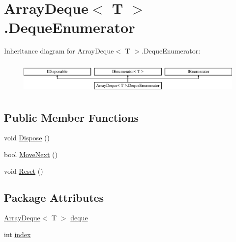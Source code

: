 \hypertarget{structOTA_1_1Misc_1_1ArrayDeque_1_1DequeEnumerator}{}\section{Array\+Deque$<$ T $>$.Deque\+Enumerator}
\label{structOTA_1_1Misc_1_1ArrayDeque_1_1DequeEnumerator}
Inheritance diagram for Array\+Deque$<$ T $>$.Deque\+Enumerator\+:\begin{figure}[H]
\begin{center}
\leavevmode
\includegraphics[height=1.659259cm]{structOTA_1_1Misc_1_1ArrayDeque_1_1DequeEnumerator}
\end{center}
\end{figure}
\subsection*{Public Member Functions}
\begin{DoxyCompactItemize}
\item 
void \hyperlink{structOTA_1_1Misc_1_1ArrayDeque_1_1DequeEnumerator_a6e2d745cdb7a7b983f861ed6a9a541a7}{Dispose} ()
\item 
bool \hyperlink{structOTA_1_1Misc_1_1ArrayDeque_1_1DequeEnumerator_ad5316c283894d57be1450edab878aed0}{Move\+Next} ()
\item 
void \hyperlink{structOTA_1_1Misc_1_1ArrayDeque_1_1DequeEnumerator_a372de693ad40b3f42839c8ec6ac845f4}{Reset} ()
\end{DoxyCompactItemize}
\subsection*{Package Attributes}
\begin{DoxyCompactItemize}
\item 
\hyperlink{classOTA_1_1Misc_1_1ArrayDeque}{Array\+Deque}$<$ T $>$ \hyperlink{structOTA_1_1Misc_1_1ArrayDeque_1_1DequeEnumerator_ab92e4810966fce91e2eec5cd3d2ed6a5}{deque}
\item 
int \hyperlink{structOTA_1_1Misc_1_1ArrayDeque_1_1DequeEnumerator_a750b5d744c39a06bfb13e6eb010e35d0}{index}
\end{DoxyCompactItemize}
